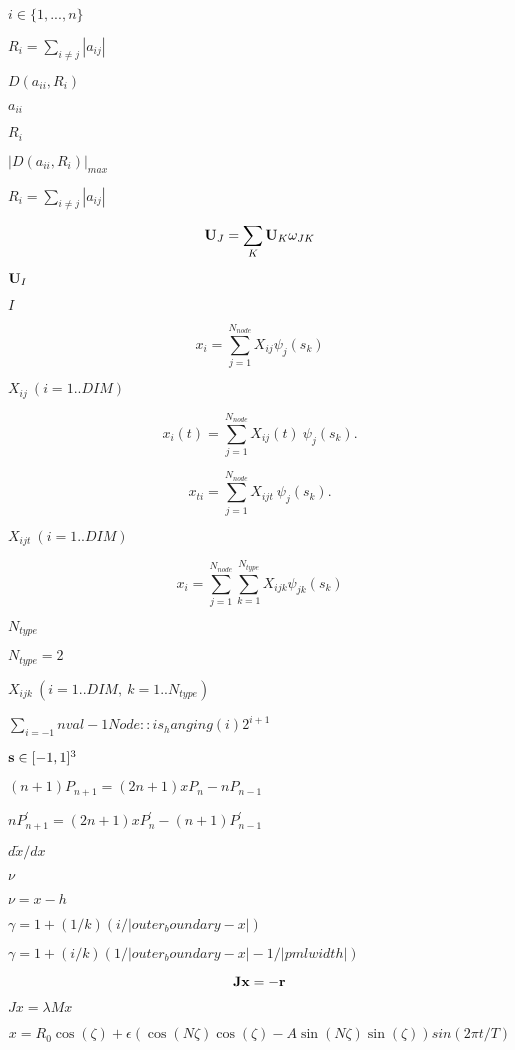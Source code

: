 \documentclass{article}
\begin{document}
$ i \in \{ 1,...,n \} $
\pagebreak

$ R_i = \sum_{i\neq j} |a_{ij}| $
\pagebreak

$ D(a_{ii},R_i) $
\pagebreak

$ a_{ii} $
\pagebreak

$ R_i $
\pagebreak

$ |D(a_{ii},R_i)|_{max} $
\pagebreak

$ R_i = \sum_{i\neq j}|a_{ij}| $
\pagebreak

\[ {\bf U}_J = \sum_{K} {\bf U}_{K} \omega_{JK} \]
\pagebreak

$ {\bf U}_I $
\pagebreak

$ I $
\pagebreak

\[ x_i = \sum_{j=1}^{N_{node}} X_{ij} \psi_{j}(s_k) \]
\pagebreak

$ X_{ij}\ (i=1..DIM) $
\pagebreak

\[ x_i(t) = \sum_{j=1}^{N_{node}} X_{ij}(t) \ \psi_{j}(s_k). \]
\pagebreak

\[ x_{ti} = \sum_{j=1}^{N_{node}} X_{ijt} \ \psi_{j}(s_k). \]
\pagebreak

$ X_{ijt} \ (i=1..DIM) $
\pagebreak

\[ x_i = \sum_{j=1}^{N_{node}} \sum_{k=1}^{N_{type}} X_{ijk} \psi_{jk}(s_k) \]
\pagebreak

$ N_{type} $
\pagebreak

$ N_{type}=2 $
\pagebreak

$ X_{ijk} \ (i=1..DIM, \ k=1..N_{type}) $
\pagebreak

$ \sum_{i=-1}{nval-1} Node::is_hanging(i) 2^{i+1} $
\pagebreak

$ {\bf s} \in [-1,1]^3 $
\pagebreak

$ (n+1) P_{n+1} = (2n+1)xP_{n} - nP_{n-1} $
\pagebreak

$ nP_{n+1}^{'} = (2n+1)xP_{n}^{'} - (n+1)P_{n-1}^{'} $
\pagebreak

$d\tilde x / d x$
\pagebreak

$\nu$
\pagebreak

$\nu = x - h$
\pagebreak

$\gamma=1 + (1/k)(i/|outer_boundary - x|)$
\pagebreak

$\gamma=1 + (i/k)(1/|outer_boundary - x|-1/|pml width|)$
\pagebreak

\[ {\bf J} {\bf x} = - \bf{r} \]
\pagebreak

$ Jx = \lambda M x$
\pagebreak

\[ x = R_0 \cos(\zeta) + \epsilon \left( \cos(N \zeta) \cos(\zeta) - A \sin(N \zeta) \sin(\zeta) \right) sin(2 \pi t/T) \]
\pagebreak
\end{document}
